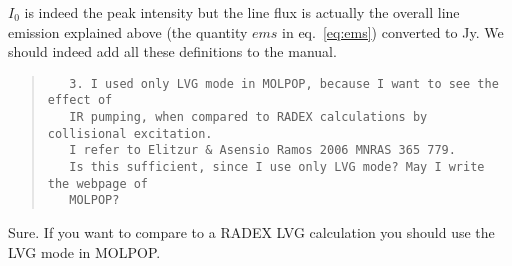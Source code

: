 \documentclass[12pt]{article}
\begin{document}
$I_0$ is indeed the peak intensity but the line flux is actually the overall
line emission explained above (the quantity $ems$ in eq.\ \ref{eq:ems})
converted to Jy. We should indeed add all these definitions to the manual.

\begin{quote}
  \begin{verbatim}
   3. I used only LVG mode in MOLPOP, because I want to see the effect of
   IR pumping, when compared to RADEX calculations by collisional excitation.
   I refer to Elitzur & Asensio Ramos 2006 MNRAS 365 779.
   Is this sufficient, since I use only LVG mode? May I write the webpage of
   MOLPOP?
  \end{verbatim}
\end{quote}

Sure. If you want to compare to a RADEX LVG calculation you should use the LVG
mode in MOLPOP. 
\end{document}
